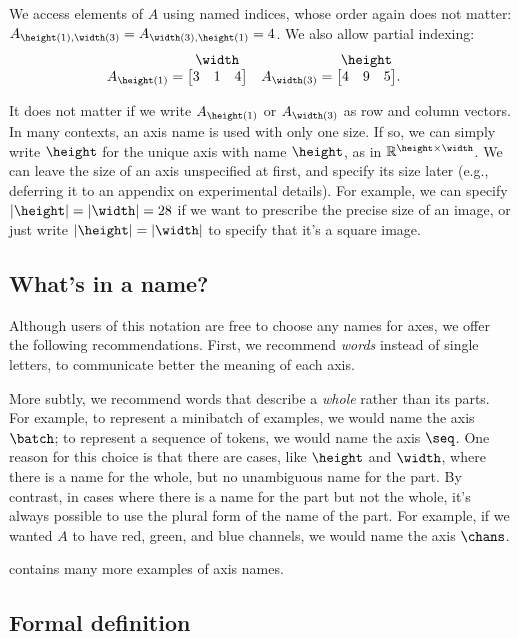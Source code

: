 We access elements of $A$ using named indices, whose order again does not matter: $A_{\height(1), \width(3)} = A_{\width(3), \height(1)} = 4$.
We also allow partial indexing:
\begin{align*}
A_{\height(1)} &= \nmatrix{}{\width}{
  3 & 1 & 4
}
&
A_{\width(3)} &= \nmatrix{}{\height}{
  4 & 9 & 5
}.
\end{align*}

It does not matter if we write  $A_{\height(1)}$ or $A_{\width(3)}$ as row and column vectors.
In many contexts, an axis name is used with only one size. If so, we can simply write $\height$ for the unique axis with name $\height$, as in $\mathbb{R}^{\height \times \width}$. 
We can leave the size of an axis unspecified at first, and specify its size later (e.g., deferring it to an appendix on experimental details).
For example, we can specify $|\height|=|\width|=28$ if we want to prescribe the precise size of an image, or just write $|\height|=|\width|$ to specify that it's a square image.

\subsection{What's in a name?}
\label{sec:goodnames}

Although users of this notation are free to choose any names for axes, we offer the following recommendations.
First, we recommend \emph{words} instead of single letters, to communicate better the meaning of each axis. 

More subtly, we recommend words that describe a \emph{whole} rather than its parts. For example, to represent a minibatch of examples, we would name the axis $\batch$; to represent a sequence of tokens, we would name the axis $\seq$. 
One reason for this choice is that there are cases, like $\height$ and $\width$, where there is a name for the whole, but no unambiguous name for the part. By contrast, in cases where there is a name for the part but not the whole, it's always possible to use the plural form of the name of the part. For example, if we wanted $A$ to have red, green, and blue channels, we would name the axis $\chans$.

 contains many more examples of axis names.

\subsection{Formal definition}

